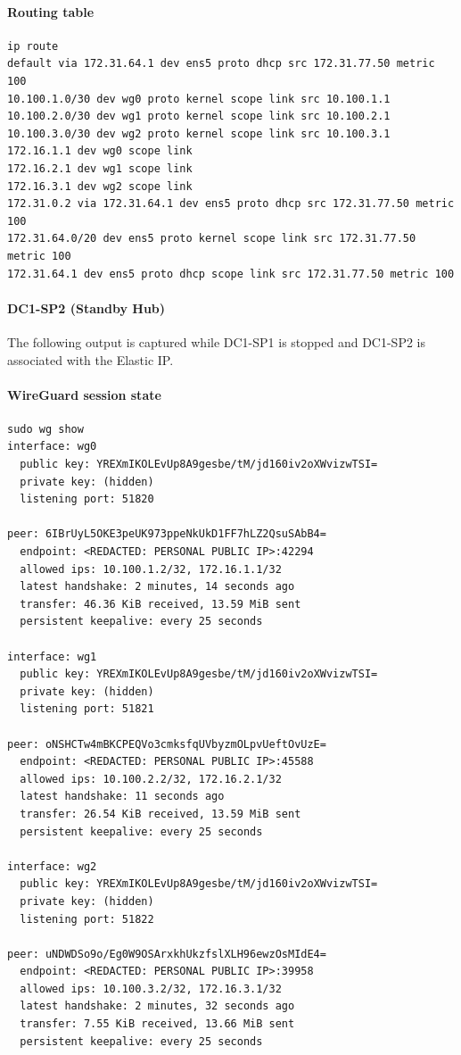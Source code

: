 \documentclass[11pt]{article}
\begin{document}
\paragraph{Routing table}

\begin{verbatim}
ip route
default via 172.31.64.1 dev ens5 proto dhcp src 172.31.77.50 metric 100
10.100.1.0/30 dev wg0 proto kernel scope link src 10.100.1.1
10.100.2.0/30 dev wg1 proto kernel scope link src 10.100.2.1
10.100.3.0/30 dev wg2 proto kernel scope link src 10.100.3.1
172.16.1.1 dev wg0 scope link
172.16.2.1 dev wg1 scope link
172.16.3.1 dev wg2 scope link
172.31.0.2 via 172.31.64.1 dev ens5 proto dhcp src 172.31.77.50 metric 100
172.31.64.0/20 dev ens5 proto kernel scope link src 172.31.77.50 metric 100
172.31.64.1 dev ens5 proto dhcp scope link src 172.31.77.50 metric 100
\end{verbatim}

\paragraph{DC1-SP2 (Standby Hub)}

The following output is captured while DC1-SP1 is stopped and DC1-SP2 is associated with the Elastic IP.

\paragraph{WireGuard session state}

\begin{verbatim}
sudo wg show
interface: wg0
  public key: YREXmIKOLEvUp8A9gesbe/tM/jd160iv2oXWvizwTSI=
  private key: (hidden)
  listening port: 51820

peer: 6IBrUyL5OKE3peUK973ppeNkUkD1FF7hLZ2QsuSAbB4=
  endpoint: <REDACTED: PERSONAL PUBLIC IP>:42294
  allowed ips: 10.100.1.2/32, 172.16.1.1/32
  latest handshake: 2 minutes, 14 seconds ago
  transfer: 46.36 KiB received, 13.59 MiB sent
  persistent keepalive: every 25 seconds

interface: wg1
  public key: YREXmIKOLEvUp8A9gesbe/tM/jd160iv2oXWvizwTSI=
  private key: (hidden)
  listening port: 51821

peer: oNSHCTw4mBKCPEQVo3cmksfqUVbyzmOLpvUeftOvUzE=
  endpoint: <REDACTED: PERSONAL PUBLIC IP>:45588
  allowed ips: 10.100.2.2/32, 172.16.2.1/32
  latest handshake: 11 seconds ago
  transfer: 26.54 KiB received, 13.59 MiB sent
  persistent keepalive: every 25 seconds

interface: wg2
  public key: YREXmIKOLEvUp8A9gesbe/tM/jd160iv2oXWvizwTSI=
  private key: (hidden)
  listening port: 51822

peer: uNDWDSo9o/Eg0W9OSArxkhUkzfslXLH96ewzOsMIdE4=
  endpoint: <REDACTED: PERSONAL PUBLIC IP>:39958
  allowed ips: 10.100.3.2/32, 172.16.3.1/32
  latest handshake: 2 minutes, 32 seconds ago
  transfer: 7.55 KiB received, 13.66 MiB sent
  persistent keepalive: every 25 seconds
\end{verbatim}
\end{document}
